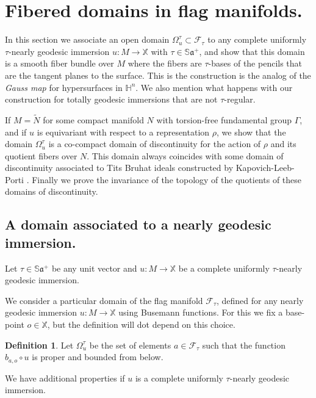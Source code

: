 \documentclass[reqno,10pt]{amsart}
\theoremstyle{plain}
\theoremstyle{definition}
\newtheorem{defn}[thm]{Definition}
\theoremstyle{remark}
\newcommand{\type}{\tau}
\newcommand{\Sph}{\mathbb{S}}
\newcommand{\X}{\mathbb{X}}
\begin{document}
\section{Fibered domains in flag manifolds.}
\label{sec:Fibration}

In this section we associate an open domain $\Omega^\type_u\subset \mathcal{F}_\type$ to any complete uniformly $\type$-nearly geodesic immersion $u:M\to \X$ with $\type\in \Sph\mathfrak{a}^+$, and show that this domain is a smooth fiber bundle over $M$ where the fibers are $\type$-bases of the pencils that are the tangent planes to the surface. This is the construction is the analog of the \emph{Gauss map} for hypersurfaces in $\mathbb{H}^n$. We also mention what happens with our construction for totally geodesic immersions that are not $\type$-regular.

\medskip

If $M=\tilde{N}$ for some compact manifold $N$ with torsion-free fundamental group $\Gamma$, and if $u$ is equivariant with respect to a representation $\rho$, we show that the domain $\Omega^\type_u$ is a co-compact domain of discontinuity for the action of $\rho$ and its quotient fibers over $N$. This domain always coincides with some domain of discontinuity associated to Tits Bruhat ideals constructed by Kapovich-Leeb-Porti \cite{KLP-DoD}. Finally we prove the invariance of the topology of the quotients of these domains of discontinuity. 

\subsection{A domain associated to a nearly geodesic immersion.}

 Let $\type\in \Sph\mathfrak{a}^+$ be any unit vector and $u:M\to \X$ be a complete uniformly $\type$-nearly geodesic immersion.
 
\medskip

We consider a particular domain of the flag manifold $\mathcal{F}_\type$, defined for any nearly geodesic immersion $u:M\to \X$ using Busemann functions. For this we fix a base-point $o\in \X$, but the definition will dot depend on this choice.

\begin{defn}
\label{defn:DoDNearly}
Let $\Omega^\type_u$ be the set of elements  $a\in\mathcal{F}_\type$ such that the function $b_{a,o}\circ u$ is proper and bounded from below.
\end{defn}

We have additional properties if $u$ is a complete uniformly $\type$-nearly geodesic immersion.
\end{document}
